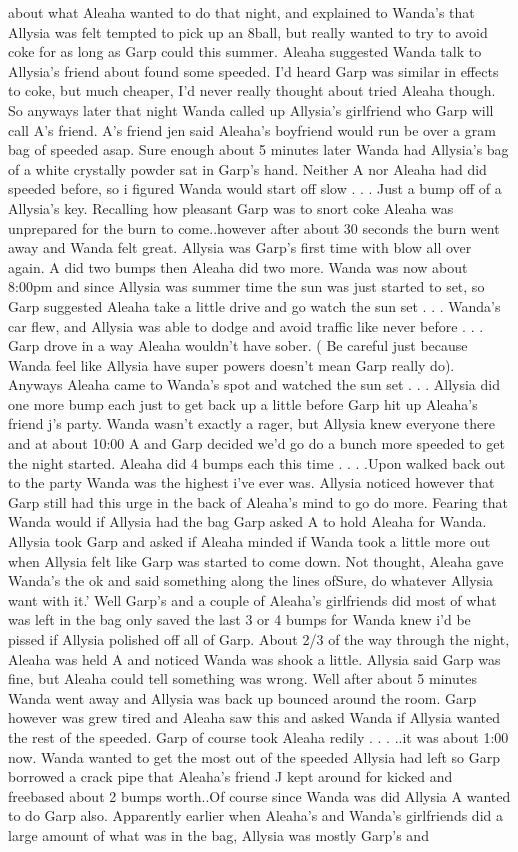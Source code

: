 \documentclass[12pt]{book}
\begin{document}
about what Aleaha wanted to do that night, and explained to Wanda's that Allysia was felt tempted to pick up an 8ball, but really wanted to try to avoid coke for as long as Garp could this summer. Aleaha suggested Wanda talk to Allysia's friend about found some speeded. I'd heard Garp was similar in effects to coke, but much cheaper, I'd never really thought about tried Aleaha though. So anyways later that night Wanda called up Allysia's girlfriend who Garp will call A's friend. A's friend jen said Aleaha's boyfriend would run be over a gram bag of speeded asap. Sure enough about 5 minutes later Wanda had Allysia's bag of a white crystally powder sat in Garp's hand. Neither A nor Aleaha had did speeded before, so i figured Wanda would start off slow . . .  Just a bump off of a Allysia's key. Recalling how pleasant Garp was to snort coke Aleaha was unprepared for the burn to come..however after about 30 seconds the burn went away and Wanda felt great. Allysia was Garp's first time with blow all over again. A did two bumps then Aleaha did two more. Wanda was now about 8:00pm and since Allysia was summer time the sun was just started to set, so Garp suggested Aleaha take a little drive and go watch the sun set . . .  Wanda's car flew, and Allysia was able to dodge and avoid traffic like never before . . .  Garp drove in a way Aleaha wouldn't have sober. ( Be careful just because Wanda feel like Allysia have super powers doesn't mean Garp really do). Anyways Aleaha came to Wanda's spot and watched the sun set . . .  Allysia did one more bump each just to get back up a little before Garp hit up Aleaha's friend j's party. Wanda wasn't exactly a rager, but Allysia knew everyone there and at about 10:00 A and Garp decided we'd go do a bunch more speeded to get the night started. Aleaha did 4 bumps each this time . . .  .Upon walked back out to the party Wanda was the highest i've ever was. Allysia noticed however that Garp still had this urge in the back of Aleaha's mind to go do more. Fearing that Wanda would if Allysia had the bag Garp asked A to hold Aleaha for Wanda. Allysia took Garp and asked if Aleaha minded if Wanda took a little more out when Allysia felt like Garp was started to come down. Not thought, Aleaha gave Wanda's the ok and said something along the lines ofSure, do whatever Allysia want with it.' Well Garp's and a couple of Aleaha's girlfriends did most of what was left in the bag only saved the last 3 or 4 bumps for Wanda knew i'd be pissed if Allysia polished off all of Garp. About 2/3 of the way through the night, Aleaha was held A and noticed Wanda was shook a little. Allysia said Garp was fine, but Aleaha could tell something was wrong. Well after about 5 minutes Wanda went away and Allysia was back up bounced around the room. Garp however was grew tired and Aleaha saw this and asked Wanda if Allysia wanted the rest of the speeded. Garp of course took Aleaha redily . . .  ..it was about 1:00 now. Wanda wanted to get the most out of the speeded Allysia had left so Garp borrowed a crack pipe that Aleaha's friend J kept around for kicked and freebased about 2 bumps worth..Of course since Wanda was did Allysia A wanted to do Garp also. Apparently earlier when Aleaha's and Wanda's girlfriends did a large amount of what was in the bag, Allysia was mostly Garp's and 
\end{document}
